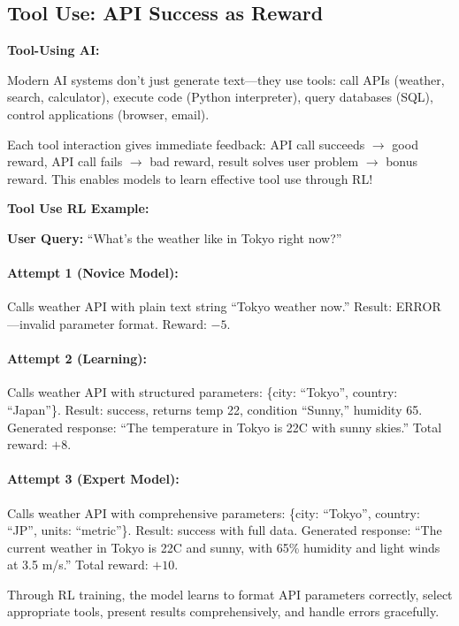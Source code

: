 \begin{chapterenv}
\section{Tool Use: API Success as Reward}

\begin{infobox}
\textbf{Tool-Using AI:}

Modern AI systems don't just generate text---they use tools: call APIs (weather, search, calculator), execute code (Python interpreter), query databases (SQL), control applications (browser, email).

Each tool interaction gives immediate feedback: API call succeeds $\to$ good reward, API call fails $\to$ bad reward, result solves user problem $\to$ bonus reward. This enables models to learn effective tool use through RL!
\end{infobox}

\textbf{Tool Use RL Example:}

\textbf{User Query:} ``What's the weather like in Tokyo right now?''

\paragraph{Attempt 1 (Novice Model):} Calls weather API with plain text string ``Tokyo weather now.'' Result: ERROR---invalid parameter format. Reward: $-5$.

\paragraph{Attempt 2 (Learning):} Calls weather API with structured parameters: \{city: ``Tokyo'', country: ``Japan''\}. Result: success, returns temp 22, condition ``Sunny,'' humidity 65. Generated response: ``The temperature in Tokyo is 22C with sunny skies.'' Total reward: $+8$.

\paragraph{Attempt 3 (Expert Model):} Calls weather API with comprehensive parameters: \{city: ``Tokyo'', country: ``JP'', units: ``metric''\}. Result: success with full data. Generated response: ``The current weather in Tokyo is 22C and sunny, with 65\% humidity and light winds at 3.5 m/s.'' Total reward: $+10$.

Through RL training, the model learns to format API parameters correctly, select appropriate tools, present results comprehensively, and handle errors gracefully.


\end{chapterenv}
